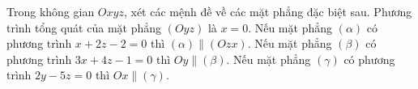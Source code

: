 \begin{ex}
Trong không gian $Oxyz$, xét các mệnh đề về các mặt phẳng đặc biệt sau.
\choiceTF
{\True Phương trình tổng quát của mặt phẳng $(Oyz)$ là $x=0$.}
{Nếu mặt phẳng $(\alpha)$ có phương trình $x+2z-2=0$ thì $(\alpha)\parallel(Ozx)$.}
{\True Nếu mặt phẳng $(\beta)$ có phương trình $3x+4z-1=0$ thì $Oy\parallel(\beta)$.}
{Nếu mặt phẳng $(\gamma)$ có phương trình $2y-5z=0$ thì $Ox\parallel(\gamma)$.}
\end{ex}

